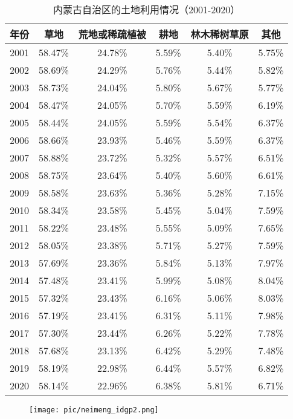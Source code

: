 \documentclass{article}
\begin{document}
		\begin{table}[H]
			\centering
			\begin{tabular}{|c|c|c|c|c|c|}
				\hline
				年份 & 草地 & 荒地或稀疏植被 & 耕地 & 林木稀树草原 & 其他 \\
				\hline
				2001 & 58.47\% & 24.78\% & 5.59\% & 5.40\% & 5.75\% \\
				2002 & 58.69\% & 24.29\% & 5.76\% & 5.44\% & 5.82\% \\
				2003 & 58.73\% & 24.04\% & 5.80\% & 5.67\% & 5.77\% \\
				2004 & 58.47\% & 24.05\% & 5.70\% & 5.59\% & 6.19\% \\
				2005 & 58.44\% & 24.05\% & 5.59\% & 5.54\% & 6.37\% \\
				2006 & 58.66\% & 23.93\% & 5.46\% & 5.59\% & 6.37\% \\
				2007 & 58.88\% & 23.72\% & 5.32\% & 5.57\% & 6.51\% \\
				2008 & 58.75\% & 23.64\% & 5.40\% & 5.60\% & 6.61\% \\
				2009 & 58.58\% & 23.63\% & 5.36\% & 5.28\% & 7.15\% \\
				2010 & 58.34\% & 23.58\% & 5.45\% & 5.04\% & 7.59\% \\
				2011 & 58.22\% & 23.48\% & 5.55\% & 5.09\% & 7.65\% \\
				2012 & 58.05\% & 23.38\% & 5.71\% & 5.27\% & 7.59\% \\
				2013 & 57.69\% & 23.36\% & 5.84\% & 5.13\% & 7.97\% \\
				2014 & 57.48\% & 23.41\% & 5.99\% & 5.08\% & 8.04\% \\
				2015 & 57.32\% & 23.43\% & 6.16\% & 5.06\% & 8.03\% \\
				2016 & 57.19\% & 23.41\% & 6.31\% & 5.11\% & 7.98\% \\
				2017 & 57.30\% & 23.44\% & 6.26\% & 5.22\% & 7.78\% \\
				2018 & 57.68\% & 23.13\% & 6.42\% & 5.29\% & 7.48\% \\
				2019 & 58.19\% & 22.98\% & 6.44\% & 5.57\% & 6.82\% \\
				2020 & 58.14\% & 22.96\% & 6.38\% & 5.81\% & 6.71\% \\
				\hline
			\end{tabular}
			\caption{内蒙古自治区的土地利用情况（2001-2020）}
		\end{table}
		
				\begin{figure}[H]  %
			\centering
			\texttt{[image: pic/neimeng\_idgp2.png]} %
		\end{figure}
		
\end{document}
